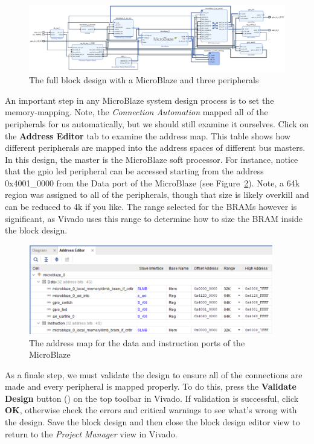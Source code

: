 \documentclass[11pt]{article}
\begin{document}
\begin{figure}[h]
    \centering
    \includegraphics[width=\textwidth]{images/block_design_full.png}
    \caption{The full block design with a MicroBlaze and three peripherals}
    \label{fig:block_design_full}
\end{figure}

An important step in any MicroBlaze system design process is to set the memory-mapping. Note, the \textit{Connection Automation} mapped all of the peripherals for us automatically, but we should still examine it ourselves. Click on the \textbf{Address Editor} tab to examine the address map. This table shows how different peripherals are mapped into the address spaces of different bus masters. In this design, the master is the MicroBlaze soft processor. For instance, notice that the gpio led peripheral can be accessed starting from the address 0x4001\_0000 from the Data port of the MicroBlaze (see Figure~\ref{fig:address_map}). Note, a 64k region was assigned to all of the peripherals, though that size is likely overkill and can be reduced to 4k if you like. The range selected for the BRAMs however is significant, as Vivado uses this range to determine how to size the BRAM inside the block design.

\begin{figure}[h]
    \centering
    \includegraphics[width=0.95\textwidth]{images/address_map.png}
    \caption{The address map for the data and instruction ports of the MicroBlaze}
    \label{fig:address_map}
\end{figure}

As a finale step, we must validate the design to ensure all of the connections are made and every peripheral is mapped properly. To do this, press the \textbf{Validate Design} button
()
on the top toolbar in Vivado. If validation is successful, click \textbf{OK}, otherwise check the errors and critical warnings to see what's wrong with the design. Save the block design and then close the block design editor view to return to the \textit{Project Manager} view in Vivado.
\end{document}

